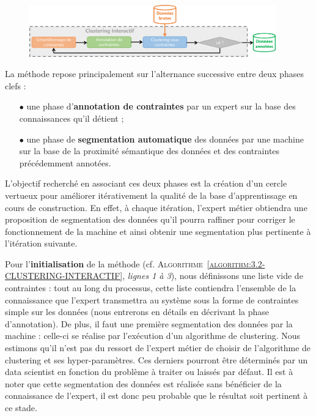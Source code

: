 		
		\begin{figure}[!htb]
			\centering
			\includegraphics[width=0.95\textwidth]{figures/interactive-clustering-architecture-sequentielle}
			\label{figure:3.2-CLUSTERING-INTERACTIF}
		\end{figure}
		
		La méthode repose principalement sur l'alternance successive entre deux phases clefs :
		\begin{itemize}
			\item[\(\bullet\)] une phase d'\textbf{annotation de contraintes}
			par un expert sur la base des connaissances qu'il détient ;
			\item[\(\bullet\)] une phase de \textbf{segmentation automatique} des données
			par une machine sur la base de la proximité sémantique des données et des contraintes précédemment annotées.
		\end{itemize}
		
		L'objectif recherché en associant ces deux phases est la création d'un cercle vertueux pour améliorer itérativement la qualité de la base d'apprentissage en cours de construction.
		En effet, à chaque itération, l'expert métier obtiendra une proposition de segmentation des données qu'il pourra raffiner pour corriger le fonctionnement de la machine et ainsi obtenir une segmentation plus pertinente à l'itération suivante.
		
		Pour l'\textbf{initialisation} de la méthode (cf. \textsc{Algorithme~\ref{algorithm:3.2-CLUSTERING-INTERACTIF}}, \textit{lignes 1 à 3}), nous définissons une liste vide de contraintes : tout au long du processus, cette liste contiendra l'ensemble de la connaissance que l'expert transmettra au système sous la forme de contraintes simple sur les données (nous entrerons en détails en décrivant la phase d'annotation).
		De plus, il faut une première segmentation des données par la machine : celle-ci se réalise par l'exécution d'un algorithme de clustering.
		Nous estimons qu'il n'est pas du ressort de l'expert métier de choisir de l'algorithme de clustering et ses hyper-paramètres.
		Ces derniers pourront être déterminés par un data scientist en fonction du problème à traiter ou laissés par défaut.
		Il est à noter que cette segmentation des données est réalisée sans bénéficier de la connaissance de l'expert, il est donc peu probable que le résultat soit pertinent à ce stade.
		
